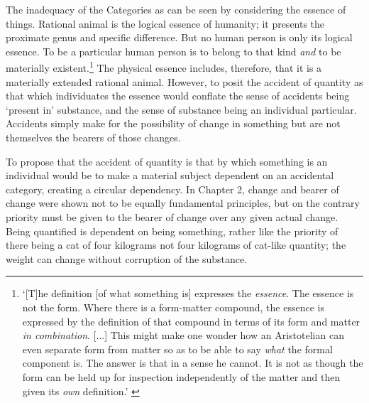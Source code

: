 The inadequacy of the Categories as can be seen by considering the essence of things. Rational animal is the logical essence of humanity; it presents the proximate genus and specific difference.
But no human person is only its logical essence.
To be a particular human person is to belong to that kind \emph{and} to be materially existent.\footnote{`[T]he definition [of what something is] expresses the \emph{essence}. The essence is not the form. Where there is a form-matter compound, the essence is expressed by the definition of that compound in terms of its form and matter \emph{in combination}. [...] This might make one wonder how an Aristotelian can even separate form from matter so as to be able to say \emph{what} the formal component is. The answer is that in a sense he cannot. It is not as though the form can be held up for inspection independently of the matter and then given its \emph{own} definition.' \parencite[][167--68]{Oderberg2014-ODEIFS}} The physical essence includes, therefore, that it is a materially extended rational animal. However, to posit the accident of quantity as that which individuates the essence would conflate the sense of accidents being `present in' substance, and the sense of substance being an individual particular. Accidents simply make for the possibility of change in something but are not themselves the bearers of those changes.

To propose that the accident of quantity is that by which something is an individual would be to make a material subject dependent on an accidental category, creating a circular dependency. In Chapter 2, change and bearer of change were shown not to be equally fundamental principles, but on the contrary priority must be given to the bearer of change over any given actual change. Being quantified is dependent on being something, rather like the priority of there being a cat of four kilograms not four kilograms of cat-like quantity; the weight can change without corruption of the substance.

